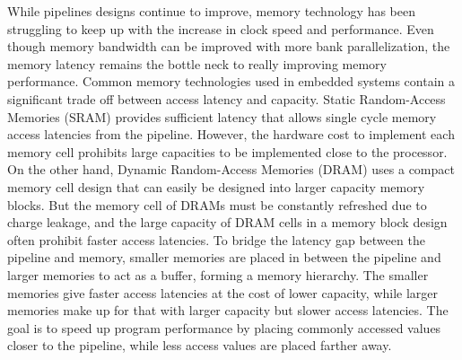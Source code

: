 While pipelines designs continue to improve, memory technology has been struggling to keep up with the increase in clock speed and performance.
Even though memory bandwidth can be improved with more bank parallelization, the memory latency remains the bottle neck to really improving memory performance.
Common memory technologies used in embedded systems contain a significant trade off between access latency and capacity. 
Static Random-Access Memories (SRAM) provides sufficient latency that allows single cycle memory access latencies from the pipeline.
However, the hardware cost to implement each memory cell prohibits large capacities to be implemented close to the processor.
On the other hand, Dynamic Random-Access Memories (DRAM) uses a compact memory cell design that can easily be designed into larger capacity memory blocks.
But the memory cell of DRAMs must be constantly refreshed due to charge leakage, and the large capacity of DRAM cells in a memory block design often prohibit faster access latencies.
To bridge the latency gap between the pipeline and memory, smaller memories are placed in between the pipeline and larger memories to act as a buffer, forming a memory hierarchy.
The smaller memories give faster access latencies at the cost of lower capacity, while larger memories make up for that with larger capacity but slower access latencies. 
The goal is to speed up program performance by placing commonly accessed values closer to the pipeline, while less access values are placed farther away.

